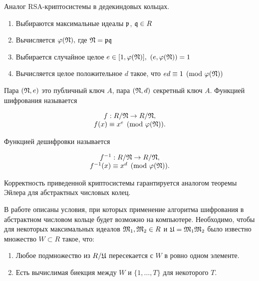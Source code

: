 \documentclass[_00_dissertation.tex]{subfiles}
\begin{document}
\begin{algorithm}\label{algorithm:RSA_in_dedekind}
    Аналог RSA-криптосистемы в дедекиндовых кольцах.

    \begin{enumerate}
        \item Выбираются максимальные идеалы $\mathfrak{p}$, $\mathfrak{q}\in R$

        \item Вычисляется $\varphi(\mathfrak{N}),$ где $\mathfrak{N} = \mathfrak{p} \mathfrak{q}$

        \item Выбирается случайное целое $e \in [1, \varphi(\mathfrak{N})],$ $(e, \varphi(\mathfrak{N}))=1$

        \item Вычисляется целое положительное $d$ такое, что $ed \equiv 1 \pmod{\varphi(\mathfrak{N})}$
    \end{enumerate}

    Пара $(\mathfrak{N}, e)$ это публичный ключ $A$, пара $(\mathfrak{N}, d)$ секретный ключ $A$.
    Функцией шифрования называется

    \begin{equation*}
        \begin{array}{c}
            f: R/\mathfrak{N} \to R/\mathfrak{N},\\
            f(x) \equiv x^{e} \pmod{\varphi(\mathfrak{N})}.
        \end{array}
    \end{equation*}

    Функцией дешифровки называется

    \begin{equation*}
        \begin{array}{c}
            f^{-1}: R/\mathfrak{N} \to R/\mathfrak{N},\\
            f^{-1}(x) \equiv x^{d}\pmod{\varphi(\mathfrak{N})}.
        \end{array}
    \end{equation*}
\end{algorithm}

\begin{remark}
    Корректность приведенной криптосистемы гарантируется аналогом теоремы Эйлера для абстрактных числовых колец.
\end{remark}

\begin{remark}
    В работе \cite{Petukhova} описаны условия, при которых применение алгоритма шифрования в абстрактном числовом кольце будет возможно на компьютере.
    Необходимо, чтобы для некоторых максимальных идеалов $\mathfrak{M}_1, \mathfrak{M}_2 \in R$ и $\mathfrak{U} = \mathfrak{M}_1\mathfrak{M}_2$ было известно множество $W \subset R$ такое, что:
    \begin{enumerate}
        \item Любое подмножество из $R/\mathfrak{U}$ пересекается с $W$ в ровно одном элементе.
        
        \item Есть вычислимая биекция между $W$ и $\{1, \dots, T\}$ для некоторого $T$.
    \end{enumerate}
\end{remark}
\end{document}

